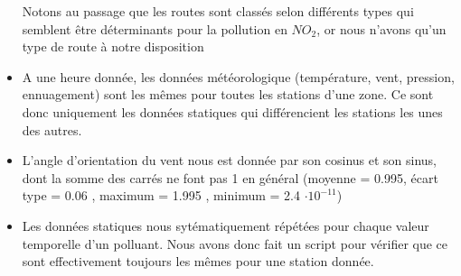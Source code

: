 \begin{itemize}
    Notons au passage que les routes sont classés selon différents types qui semblent être déterminants pour la pollution en $NO_2$, or nous n'avons qu'un type de route à notre disposition
  \item
    A une heure donnée, les données météorologique (température, vent, pression, ennuagement) sont les mêmes pour toutes les stations d'une zone.
    Ce sont donc uniquement les données statiques qui différencient les stations les unes des autres.
  \item
    L'angle d'orientation du vent nous est donnée par son cosinus et son sinus, dont la somme des carrés ne font pas 1 en général (moyenne = 0.995, écart type =  0.06 , maximum =  1.995 , minimum = 2.4 $\cdot 10^{-11}$)
  \item
    Les données statiques nous sytématiquement répétées pour chaque valeur temporelle d'un polluant.
    Nous avons donc fait un script pour vérifier que ce sont effectivement toujours les mêmes pour une station donnée.
\end{itemize}

